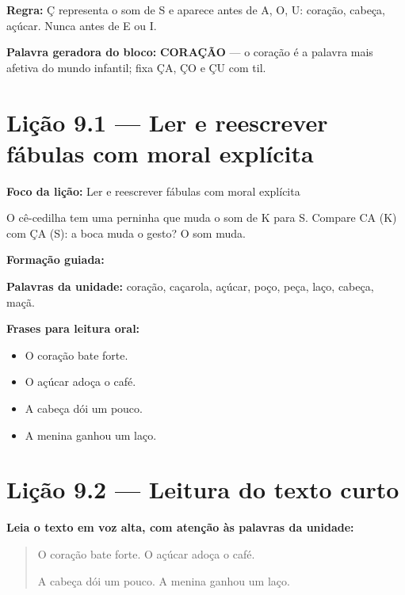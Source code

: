 \textbf{Regra:} Ç representa o som de S e aparece antes de A, O, U: coração, cabeça, açúcar. Nunca antes de E ou I.

\textbf{Palavra geradora do bloco:} \textbf{CORAÇÃO} --- o coração é a palavra mais afetiva do mundo infantil; fixa ÇA, ÇO e ÇU com til.

\section{Lição 9.1 --- Ler e reescrever fábulas com moral explícita}

\textbf{Foco da lição:} Ler e reescrever fábulas com moral explícita


\begin{boquinha}
O cê-cedilha tem uma perninha que muda o som de K para S. Compare CA (K) com ÇA (S): a boca muda o gesto? O som muda.
\end{boquinha}

\noindent\textbf{Formação guiada:}

\begin{center}
\end{center}

\noindent\textbf{Palavras da unidade:} coração, caçarola, açúcar, poço, peça, laço, cabeça, maçã.

\noindent\textbf{Frases para leitura oral:}
\begin{itemize}[leftmargin=1.6em]
  \item O coração bate forte.
  \item O açúcar adoça o café.
  \item A cabeça dói um pouco.
  \item A menina ganhou um laço.
\end{itemize}

\section{Lição 9.2 --- Leitura do texto curto}

\noindent\textbf{Leia o texto em voz alta, com atenção às palavras da unidade:}


\begin{quote}
O coração bate forte. O açúcar adoça o café.

A cabeça dói um pouco. A menina ganhou um laço.
\end{quote}

